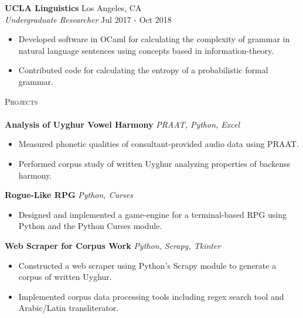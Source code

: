 \documentclass[]{article}
\newcommand{\lineunder} {
	\vspace*{-8pt} \\
	\hspace*{-18pt} \hrulefill \\
}
\newcommand{\header} [1] {
	{\hspace*{-18pt}\vspace*{6pt} \textsc{#1}}
	\vspace*{-6pt} \lineunder
}
\begin{document}
	\textbf{UCLA Linguistics} \hfill Los Angeles, CA\\
	\textit{Undergraduate Researcher} \hfill Jul 2017 - Oct 2018\\
	\vspace{-3mm}
	\begin{itemize} \itemsep 0pt
		\item Developed software in OCaml for calculating the complexity of grammar in natural language sentences using concepts based in information-theory.
		\item Contributed code for calculating the entropy of a probabilistic formal grammar.
	\end{itemize}
	
	\header{Projects}
	{\textbf{Analysis of Uyghur Vowel Harmony}} \hspace*{5mm} {\sl PRAAT, Python, Excel}
	\vspace*{-5pt}\begin{itemize}	\itemsep 0pt 
		\item Measured phonetic qualities of consultant-provided audio data using PRAAT.
		\item Performed corpus study of written Uyghur analyzing properties of backenss harmony.
	\end{itemize}
	\vspace*{0mm}
	
	{\textbf{Rogue-Like RPG}} \hspace*{5mm} {\sl Python, Curses} \\
	\vspace*{-5pt}\begin{itemize}	\itemsep 0pt
		\item Designed and implemented a game-engine for a terminal-based RPG using Python and the Python Curses module.
	\end{itemize}
	\vspace*{0mm}
	
	{\textbf{Web Scraper for Corpus Work}} \hspace*{5mm} {\sl Python, Scrapy, Tkinter}
	\vspace*{-5pt}\begin{itemize}	\itemsep 0pt 
		\item Constructed a web scraper using Python's Scrapy module to generate a corpus of written Uyghur.
		\item Implemented corpus data processing tools including regex search tool and Arabic/Latin transliterator.
	\end{itemize}
	\vspace*{0mm}
	
\end{document}
